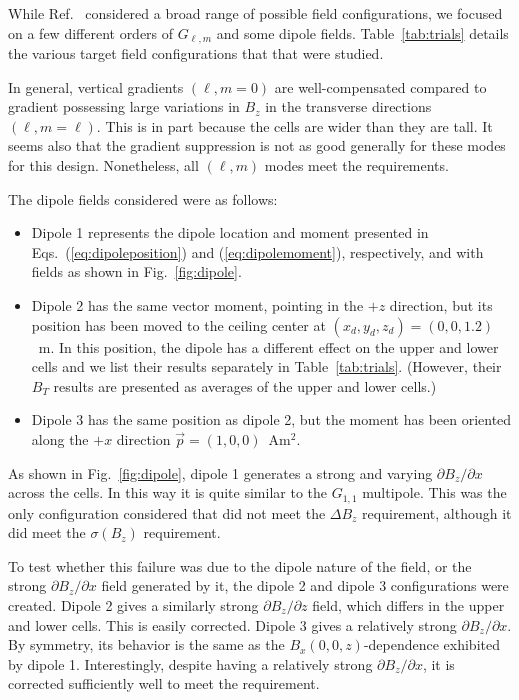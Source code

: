 \documentclass[preprint,12pt]{elsarticle}
\begin{document}
While Ref.~\cite{bib:wkthesis} considered a broad range of possible
field configurations, we focused on a few different orders of
$G_{\ell,m}$ and some dipole fields.  Table~\ref{tab:trials} details
the various target field configurations that that were studied.

In general, vertical gradients $(\ell,m=0)$ are well-compensated
compared to gradient possessing large variations in $B_z$ in the
transverse directions $(\ell,m=\ell)$.  This is in part because the
cells are wider than they are tall.  It seems also that the gradient
suppression is not as good generally for these modes for this design.
Nonetheless, all $(\ell,m)$ modes meet the requirements.

The dipole fields considered were as follows:
\begin{itemize}
  \item Dipole 1 represents the dipole location and moment presented
    in Eqs.~(\ref{eq:dipoleposition}) and (\ref{eq:dipolemoment}),
    respectively, and with fields as shown in Fig.~\ref{fig:dipole}.
  \item Dipole 2 has the same vector moment, pointing in the $+z$
    direction, but its position has been moved to the ceiling center
    at $(x_d,y_d,z_d)=(0,0,1.2)$~m.  In this position, the dipole has
    a different effect on the upper and lower cells and we list their
    results separately in Table~\ref{tab:trials}.  (However, their
    $B_T$ results are presented as averages of the upper and lower
    cells.)
  \item Dipole 3 has the same position as dipole 2, but the moment has
    been oriented along the $+x$ direction $\vec{p}=(1,0,0)$~Am$^2$.
\end{itemize}

As shown in Fig.~\ref{fig:dipole}, dipole 1 generates a strong and
varying $\partial B_z/\partial x$ across the cells.  In this way it is
quite similar to the $G_{1,1}$ multipole.  This was the only
configuration considered that did not meet the $\Delta B_z$
requirement, although it did meet the $\sigma(B_z)$ requirement.

To test whether this failure was due to the dipole nature of the
field, or the strong $\partial B_z/\partial x$ field generated by it,
the dipole 2 and dipole 3 configurations were created.  Dipole 2 gives
a similarly strong $\partial B_z/\partial z$ field, which differs in
the upper and lower cells.  This is easily corrected.  Dipole 3 gives
a relatively strong $\partial B_z/\partial x$.  By symmetry, its
behavior is the same as the $B_x(0,0,z)$-dependence exhibited by
dipole 1.  Interestingly, despite having a relatively strong $\partial
B_z/\partial x$, it is corrected sufficiently well to meet the
requirement.
\end{document}
